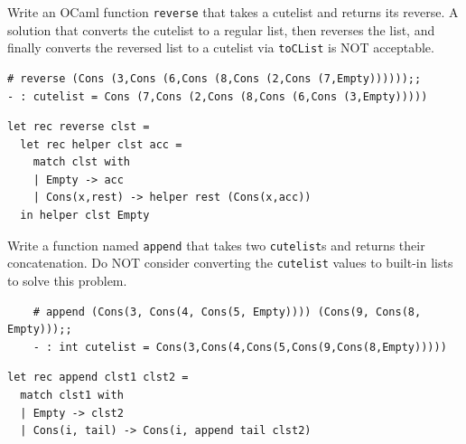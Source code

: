 \documentclass[addpoints]{exam}
\begin{document}
\begin{questions}
  \question
  Write an OCaml function \texttt{reverse} that takes a cutelist and 
  returns its reverse.
  A solution that converts the cutelist to a regular list,
  then reverses the list, and finally converts the reversed
  list to a cutelist via \texttt{toCList}
  is NOT acceptable.
  \begin{verbatim}
# reverse (Cons (3,Cons (6,Cons (8,Cons (2,Cons (7,Empty))))));;
- : cutelist = Cons (7,Cons (2,Cons (8,Cons (6,Cons (3,Empty)))))
  \end{verbatim}

  \begin{solutionbox}{4cm}
    \begin{verbatim}
let rec reverse clst =
  let rec helper clst acc =
    match clst with
    | Empty -> acc
    | Cons(x,rest) -> helper rest (Cons(x,acc))
  in helper clst Empty
    \end{verbatim}
  \end{solutionbox}

  
  \question
  Write a function named \texttt{append} that takes
  two \texttt{cutelist}s and returns their concatenation.
  Do NOT consider converting the \texttt{cutelist} values to
  built-in lists to solve this problem.
  
  \begin{verbatim}
    # append (Cons(3, Cons(4, Cons(5, Empty)))) (Cons(9, Cons(8, Empty)));;
    - : int cutelist = Cons(3,Cons(4,Cons(5,Cons(9,Cons(8,Empty)))))
  \end{verbatim}

  \begin{solutionbox}{3cm}
    \begin{verbatim}
let rec append clst1 clst2 =
  match clst1 with
  | Empty -> clst2
  | Cons(i, tail) -> Cons(i, append tail clst2)
    \end{verbatim}
  \end{solutionbox}

    
\end{questions}
\end{document}

